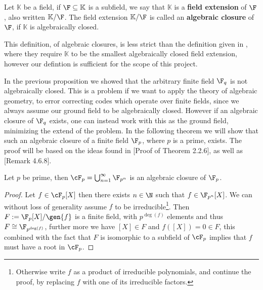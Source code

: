 \begin{definition}
  Let $\mathbb{K}$ be a field, if $\F \subseteq \mathbb{K}$ is a subfield, we say that $\mathbb{K}$ is a \textbf{field extension} of $\F$, also written $\mathbb{K} / \F$. The field extension $\mathbb{K}/\F$ is called an \textbf{algebraic closure} of $\F$, if $\mathbb{K}$ is algebraically closed.
\end{definition}
\begin{remark}
  This definition, of algebraic closures, is less strict than the definition given in \citep{alg_notes}, where they require $\mathbb{K}$ to be the smallest algebraically closed field extension, however our defintion is sufficient for the scope of this project.
\end{remark}
In the previous proposition we showed that the arbitrary finite field $\F_{q}$ is not algebraically closed.
This is a problem if we want to apply the theory of algebraic geometry, to error correcting codes which operate over finite fields, since we always assume our ground field to be algebraically closed.
However if an algebraic closure of $\F_{q}$ exists, one can instead work with this as the ground field, minimizing the extend of the problem. In the following theorem we will show that such an algebraic closure of a finite field $\F_{p}$, where $p$ is a prime, exists.
The proof will be based on the ideas found in \citep{Galois_theory}[Proof of Theorem 2.2.6], as well as \cite{alg_lauritzen}[Remark 4.6.8].
\begin{theorem}\label{prop:algebraic_closure_of_finite_field}
   Let $p$ be prime, then $\cF_{p} = \bigcup_{n = 1}^{\infty} \F_{p^{n}}$ is an algebraic closure of $\F_p$.
 \end{theorem}
 \begin{proof}
   Let $f \in \cF_{p}[X]$ then there exists $n \in \N$ such that $f \in \F_{p^{n}}[X]$.
   We can without loss of generality assume $f$ to be irreducible\footnote{Otherwise write $f$ as a product of irreducible polynomials, and continue the proof, by replacing $f$ with one of its irreducible factors.}. Then $F := \F_{p}[X] / \gen{f}$ is a finite field, with $p^{\deg(f)}$ elements and thus $F \cong \F_{p^{\deg(f)}}$, further more we have $[X] \in F$ and $f([X]) = 0 \in F$, this combined with the fact that $F$ is isomorphic to a subfield of $\cF_{p}$ implies that $f$ must have a root in $\cF_{p}$.
 \end{proof}
